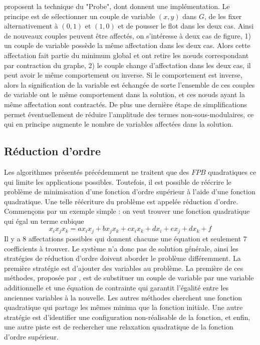 \documentclass[../main/These_Mathias_Paget.tex]{subfiles}
\begin{document}
	\cite{Boros06}  proposent la technique du "Probe", dont \cite{Rother07CVPR} donnent une implémentation. Le principe est de sélectionner un couple de variable $(x,y)$ dans $G$, de les fixer alternativement à $(0,1)$ et $(1,0)$ et de pousser le flot dans les deux cas. Ainsi de nouveaux couples peuvent être affectés, on s’intéresse à deux cas de figure, 1) un couple de variable possède la même affectation dans les deux cas. Alors cette affectation fait partie du minimum global et ont retire les nœuds correspondant par contraction du graphe, 2) le couple change d'affectation dans les deux cas, il peut avoir le même comportement ou inverse. Si le comportement est inverse, alors la signification de la variable est échangée de sorte l'ensemble de ces couples de variable ont le même comportement dans la solution, et ces nœuds ayant la même affectation sont contractés. De plus une dernière étape de simplifications permet éventuellement de réduire l'amplitude des termes non-sous-modulaires, ce qui en principe augmente le nombre de variables affectées dans la solution.

\subsection{Réduction d'ordre}
\label{ss:order_red}
	Les algorithmes présentés précédemment ne traitent que des $FPB$ quadratiques ce qui limite les applications possibles. Toutefois, il est possible de réécrire le problème de minimisation d'une fonction d'ordre supérieur à l'aide d'une fonction quadratique. Une telle réécriture du problème est appelée réduction d'ordre. Commençons par un exemple simple : on veut trouver une fonction quadratique qui égal un terme cubique
\begin{equation}
\label{eq-3to2}
x_{i}x_{j}x_{k}= ax_{i}x_{j} + bx_{j}x_{k} + cx_{i}x_{k} + dx_i + ex_j + dx_k + f
\end{equation}
Il y a 8 affectations possibles qui donnent chacune une équation et seulement 7 coefficients à trouver. Le système n'a donc pas de solution générale, ainsi les stratégies de réduction d'ordre doivent aborder le problème différemment. La première stratégie est d'ajouter des variables au problème. La première de ces méthodes, proposée par \cite{Rosenberg75}, est de substituer un couple de variable par une variable additionnelle et une équation de contrainte qui garantit l'égalité entre les anciennes variables à la nouvelle. Les autres méthodes cherchent une fonction quadratique qui partage les mêmes minima que la fonction initiale. Une autre stratégie est d'identifier une configuration non-réalisable de la fonction, et enfin, une autre piste est de rechercher une relaxation quadratique de la fonction d'ordre supérieur.
\end{document}
